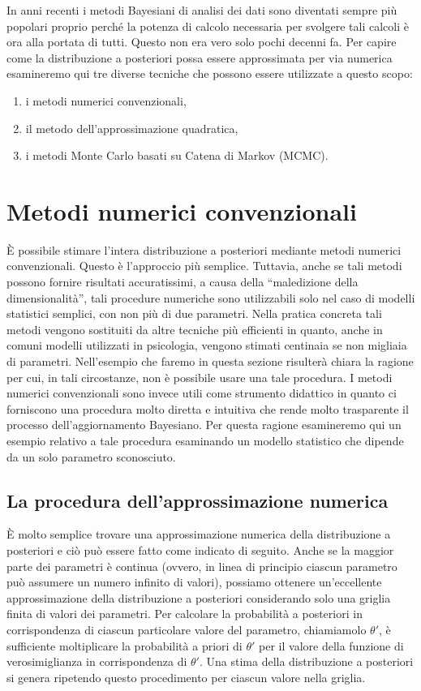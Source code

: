 In anni recenti i metodi Bayesiani di analisi dei dati sono diventati sempre più popolari proprio perché la potenza di calcolo necessaria per svolgere tali calcoli è ora alla portata di tutti.
Questo non era vero solo pochi decenni fa.
Per capire come la distribuzione a posteriori possa essere approssimata per via numerica esamineremo qui tre diverse tecniche che possono essere utilizzate a questo scopo:
\begin{enumerate}
\item i metodi numerici convenzionali,
\item il metodo dell'approssimazione quadratica,
\item i metodi Monte Carlo basati su Catena di Markov (MCMC).
\end{enumerate}


\section{Metodi numerici convenzionali}
\label{sec:met_numerici_convenzionali}

È possibile stimare l'intera distribuzione a posteriori mediante metodi numerici convenzionali.
Questo è l'approccio più semplice.
Tuttavia, anche se tali metodi possono fornire risultati accuratissimi, a causa della \enquote{maledizione della dimensionalità}, tali procedure numeriche sono utilizzabili solo nel caso di modelli statistici semplici, con non più di due parametri.
Nella pratica concreta tali metodi vengono sostituiti da altre tecniche più efficienti in quanto, anche in comuni modelli utilizzati in psicologia, vengono stimati centinaia se non migliaia di parametri.
Nell'esempio che faremo in questa sezione risulterà chiara la ragione per cui, in tali circostanze, non è possibile usare una tale procedura.
I metodi numerici convenzionali sono invece utili come strumento didattico in quanto ci forniscono una procedura molto diretta e intuitiva che rende molto trasparente il processo dell'aggiornamento Bayesiano.
Per questa ragione esamineremo qui un esempio relativo a tale procedura esaminando un modello statistico che dipende da un solo parametro sconosciuto.


\subsection{La procedura dell'approssimazione numerica}
\label{sec:appross_numerica}

È molto semplice trovare una approssimazione numerica della distribuzione a posteriori e ciò può essere fatto come indicato di seguito.
Anche se la maggior parte dei parametri è continua (ovvero, in linea di principio ciascun parametro può assumere un numero infinito di valori), possiamo ottenere un'eccellente approssimazione della  distribuzione a posteriori considerando solo una griglia finita di valori dei parametri.
Per calcolare la probabilità a posteriori in corrispondenza di ciascun particolare valore del parametro, chiamiamolo $\theta'$, è sufficiente moltiplicare la probabilità a priori di $\theta'$ per il valore della funzione di verosimiglianza in corrispondenza di $\theta'$.
Una stima della distribuzione a posteriori si genera ripetendo questo procedimento per ciascun valore nella griglia.


